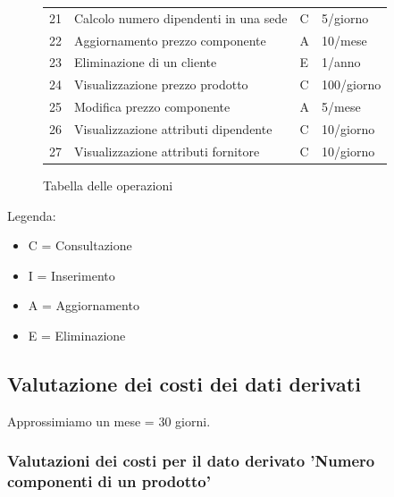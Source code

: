 \documentclass{article}
\begin{document}
\begin{figure}[H]
\begin{tabular}{|l|l|l|l|}
        21 & Calcolo numero dipendenti in una sede & C & 5/giorno \\
        22 & Aggiornamento prezzo componente & A & 10/mese \\
        23 & Eliminazione di un cliente & E & 1/anno \\
        24 & Visualizzazione prezzo prodotto & C & 100/giorno \\
        25 & Modifica prezzo componente & A & 5/mese \\
        26 & Visualizzazione attributi dipendente & C & 10/giorno \\
        27 & Visualizzazione attributi fornitore & C & 10/giorno \\
        \hline
    \end{tabular}
    \caption{Tabella delle operazioni}
\end{figure}


Legenda:
\begin{itemize}
    \item C = Consultazione
    \item I = Inserimento
    \item A = Aggiornamento
    \item E = Eliminazione
\end{itemize}

\subsection{Valutazione dei costi dei dati derivati}
Approssimiamo un mese = 30 giorni.

\newpage

\subsubsection{Valutazioni dei costi per il dato derivato 'Numero componenti di un prodotto'}
\end{document}
